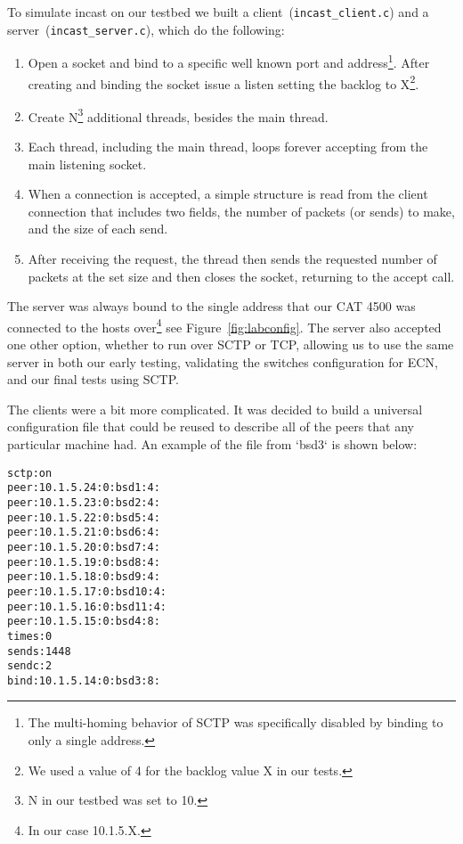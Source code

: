 \documentclass[12pt]{article}
\begin{document}
To simulate incast on our testbed we built a client~(\texttt{incast\_client.c})
and a server~(\texttt{incast\_server.c}), which  do the following:
\begin{enumerate}

\item Open a socket and bind to a specific well known port and address\footnote{The multi-homing
behavior of SCTP was specifically disabled by binding to only a single address.}. After creating and
binding the socket issue a listen setting the backlog to X\footnote{We used a value of 4 for the backlog value X in our tests.}.

\item Create N\footnote{N in our testbed was set to 10.} additional threads, besides the main thread.

\item Each thread, including the main thread, loops forever accepting from the main listening socket.

\item When a connection is accepted, a simple structure is read from the client connection that includes two fields, the
number of packets (or sends) to make, and the size of each send.

\item After receiving the request, the thread then sends the requested number of packets at the set
size and then closes the socket, returning to the accept call.

\end{enumerate}

The server
was always bound to the single address that our CAT 4500 was connected to the hosts over\footnote{In our case 10.1.5.X.}
see Figure~\ref{fig:labconfig}.
The server also accepted one other option, whether to run over SCTP or
TCP, allowing us to use
the same server in both our early testing, validating the switches configuration for ECN, and our final tests
using SCTP.

The clients were a bit more complicated. It was decided to build a universal 
configuration file that could be reused to describe all of the peers that any
particular machine had. An example of the file from `bsd3` is shown below:

\begin{verbatim}
sctp:on
peer:10.1.5.24:0:bsd1:4:
peer:10.1.5.23:0:bsd2:4:
peer:10.1.5.22:0:bsd5:4:
peer:10.1.5.21:0:bsd6:4:
peer:10.1.5.20:0:bsd7:4:
peer:10.1.5.19:0:bsd8:4:
peer:10.1.5.18:0:bsd9:4:
peer:10.1.5.17:0:bsd10:4:
peer:10.1.5.16:0:bsd11:4:
peer:10.1.5.15:0:bsd4:8:
times:0
sends:1448
sendc:2
bind:10.1.5.14:0:bsd3:8:
\end{verbatim}
\end{document}
